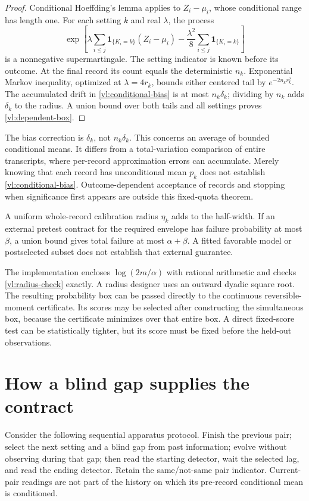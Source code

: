 \begin{proof}
Conditional Hoeffding's lemma applies to $Z_i-\mu_i$, whose conditional range
has length one. For each setting $k$ and real $\lambda$, the process
\[
 \exp\!\left[
  \lambda\sum_{i\le j}\mathbf1_{\{K_i=k\}}(Z_i-\mu_i)
  -\frac{\lambda^2}{8}\sum_{i\le j}\mathbf1_{\{K_i=k\}}
 \right]
\]
is a nonnegative supermartingale. The setting indicator is known before its
outcome. At the final record its count equals the deterministic $n_k$.
Exponential Markov inequality, optimized at $\lambda=4r_k$, bounds either
centered tail by $e^{-2n_k r_k^2}$. The accumulated drift in
\eqref{vl:conditional-bias} is at most $n_k\delta_k$; dividing by $n_k$ adds
$\delta_k$ to the radius. A union bound over both tails and all settings proves
\eqref{vl:dependent-box}.
\end{proof}

The bias correction is $\delta_k$, not $n_k\delta_k$. This concerns an average
of bounded conditional means. It differs from a total-variation comparison of
entire transcripts, where per-record approximation errors can accumulate.
Merely knowing that each record has unconditional mean $p_k$ does not establish
\eqref{vl:conditional-bias}. Outcome-dependent acceptance of records and
stopping when significance first appears are outside this fixed-quota theorem.

A uniform whole-record calibration radius $\eta_k$ adds to the half-width.
If an external pretest contract for the required envelope has failure
probability at most $\beta$, a union bound gives total failure at most
$\alpha+\beta$. A fitted favorable model or postselected subset does not
establish that external guarantee.

The implementation encloses $\log(2m/\alpha)$ with rational arithmetic and
checks \eqref{vl:radius-check} exactly. A radius designer uses an outward
dyadic square root. The resulting probability box can be passed directly to
the continuous reversible-moment certificate. Its scores may be selected
after constructing the simultaneous box, because the certificate minimizes
over that entire box. A direct fixed-score test can be statistically tighter,
but its score must be fixed before the held-out observations.

\section{How a blind gap supplies the contract}

Consider the following sequential apparatus protocol. Finish the previous
pair; select the next setting and a blind gap from past information; evolve
without observing during that gap; then read the starting detector, wait the
selected lag, and read the ending detector. Retain the same/not-same pair
indicator. Current-pair readings are not part of the history on which its
pre-record conditional mean is conditioned.


